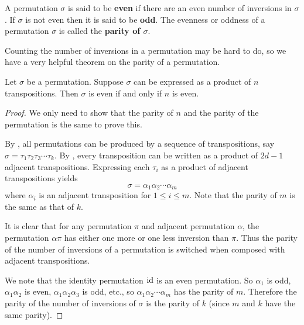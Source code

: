 \begin{definition}
    A permutation $\sigma$ is said to be \textbf{even} if there are an even number of inversions in $\sigma$. If $\sigma$ is not even then it is said to be \textbf{odd}. The evenness or oddness of a permutation $\sigma$ is called the \textbf{parity of $\sigma$}.
\end{definition}

Counting the number of inversions in a permutation may be hard to do, so we have a very helpful theorem on the parity of a permutation.

\begin{theorem}\label{thrm-parity-of-permutation}
    Let $\sigma$ be a permutation. Suppose $\sigma$ can be expressed as a product of $n$ transpositions. Then $\sigma$ is even if and only if $n$ is even.
\end{theorem}
\begin{proof}
    We only need to show that the parity of $n$ and the parity of the permutation is the same to prove this.

    By , all permutations can be produced by a sequence of transpositions, say $\sigma = \tau_1\tau_2\tau_3\cdots\tau_k$. By , every transposition can be written as a product of $2d - 1$ adjacent transpositions. Expressing each $\tau_i$ as a product of adjacent transpositions yields
    \[
        \sigma = \alpha_1\alpha_2\cdots\alpha_m
    \]
    where $\alpha_i$ is an adjacent transposition for $1 \leq i \leq m$. Note that the parity of $m$ is the same as that of $k$.

    It is clear that for any permutation $\pi$ and adjacent permutation $\alpha$, the permutation $\alpha\pi$ has either one more or one less inversion than $\pi$. Thus the parity of the number of inversions of a permutation is switched when composed with adjacent transpositions.

    We note that the identity permutation $\mathrm{id}$ is an even permutation. So $\alpha_1$ is odd, $\alpha_1\alpha_2$ is even, $\alpha_1\alpha_2\alpha_3$ is odd, etc., so $\alpha_1\alpha_2\cdots\alpha_m$ has the parity of $m$. Therefore the parity of the number of inversions of $\sigma$ is the parity of $k$ (since $m$ and $k$ have the same parity).
\end{proof}


